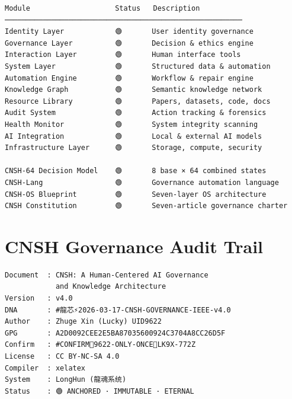 \documentclass[conference]{IEEEtran}
\begin{document}
\begin{small}
\begin{verbatim}
Module                    Status   Description
────────────────────────────────────────────────────────
Identity Layer            🟢       User identity governance
Governance Layer          🟢       Decision & ethics engine
Interaction Layer         🟢       Human interface tools
System Layer              🟢       Structured data & automation
Automation Engine         🟢       Workflow & repair engine
Knowledge Graph           🟢       Semantic knowledge network
Resource Library          🟢       Papers, datasets, code, docs
Audit System              🟢       Action tracking & forensics
Health Monitor            🟢       System integrity scanning
AI Integration            🟢       Local & external AI models
Infrastructure Layer      🟢       Storage, compute, security

CNSH-64 Decision Model    🟢       8 base × 64 combined states
CNSH-Lang                 🟢       Governance automation language
CNSH-OS Blueprint         🟢       Seven-layer OS architecture
CNSH Constitution         🟢       Seven-article governance charter
\end{verbatim}
\end{small}

\section{CNSH Governance Audit Trail}

\begin{small}
\begin{verbatim}
Document  : CNSH: A Human-Centered AI Governance
            and Knowledge Architecture
Version   : v4.0
DNA       : #龍芯⚡️2026-03-17-CNSH-GOVERNANCE-IEEE-v4.0
Author    : Zhuge Xin (Lucky) UID9622
GPG       : A2D0092CEE2E5BA87035600924C3704A8CC26D5F
Confirm   : #CONFIRM🌌9622-ONLY-ONCE🧬LK9X-772Z
License   : CC BY-NC-SA 4.0
Compiler  : xelatex
System    : LongHun (龍魂系统)
Status    : 🟢 ANCHORED · IMMUTABLE · ETERNAL
\end{verbatim}
\end{small}
\end{document}
